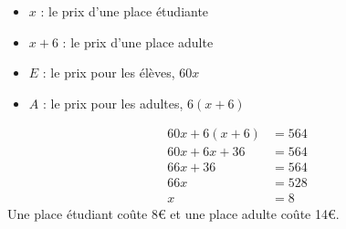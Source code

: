 %
%
    \begin{itemize}[label=\faAngleRight]
        \item $x$ : le prix d'une place étudiante
        \item $x+6$ : le prix d'une place adulte
        \item $E$ : le prix pour les élèves, $60x$
        \item $A$ : le prix pour les adultes, $6(x+6)$
    \end{itemize}
    \begin{align*}
        60x + 6(x+6)  & = 564 \\
        60x + 6x + 36 & = 564 \\
        66x + 36      & = 564 \\
        66x           & = 528 \\
        x             & = 8
    \end{align*}
    Une place étudiant coûte 8€ et une place adulte coûte 14€.
